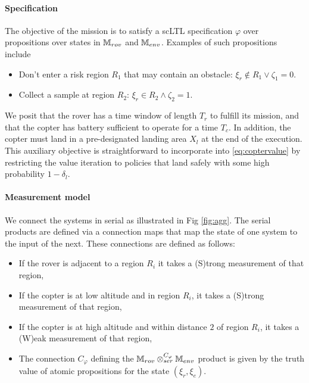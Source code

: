\documentclass[conference]{IEEEtran}
\begin{document}
\paragraph{Specification}

The objective of the mission is to satisfy a scLTL specification $\varphi$ over propositions over states in $\mathbb{M}_{rov}$ and $\mathbb{M}_{env}$. Examples of such propositions include
\begin{itemize}
  \item Don't enter a risk region $R_1$ that may contain an obstacle: $\xi_r \not  \in R_1 \lor \zeta_1 = 0$.
  \item Collect a sample at region $R_2$: $\xi_r \in R_2 \land \zeta_2 = 1$.
\end{itemize}

We posit that the rover has a time window of length $T_r$ to fulfill its mission, and that the copter has battery sufficient to operate for a time $T_c$. In addition, the copter must land in a pre-designated landing area $X_l$ at the end of the execution. This auxiliary objective is straightforward to incorporate into \eqref{eq:coptervalue} by restricting the value iteration to policies that land safely with some high probability $1-\delta_l$.

\paragraph{Measurement model}

We connect the systems in serial as illustrated in Fig \ref{fig:agg}. The serial products are defined via a connection maps that map the state of one system to the input of the next. These connections are defined as follows:
\begin{itemize}
  \item If the rover is adjacent to a region $R_i$ it takes a (S)trong measurement of that region,
  \item If the copter is at low altitude and in region $R_i$, it takes a (S)trong measurement of that region,
  \item If the copter is at high altitude and within distance $2$ of region $R_i$, it takes a (W)eak measurement of that region,
  \item The connection $C_\varphi$ defining the $\mathbb{M}_{rov} \otimes_{ser}^{C_\varphi} \mathbb{M}_{env}$ product is given by the truth value of atomic propositions for the state $(\xi_r, \xi_e)$.
\end{itemize}
\end{document}
